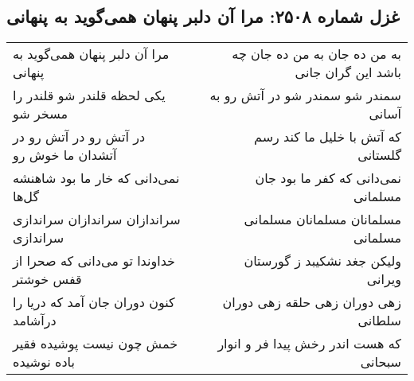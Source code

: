 \begin{center}
\section*{غزل شماره ۲۵۰۸: مرا آن دلبر پنهان همی‌گوید به پنهانی}
\label{sec:2508}
\begin{longtable}{l p{0.5cm} r}
مرا آن دلبر پنهان همی‌گوید به پنهانی
&&
به من ده جان به من ده جان چه باشد این گران جانی
\\
یکی لحظه قلندر شو قلندر را مسخر شو
&&
سمندر شو سمندر شو در آتش رو به آسانی
\\
در آتش رو در آتش رو در آتشدان ما خوش رو
&&
که آتش با خلیل ما کند رسم گلستانی
\\
نمی‌دانی که خار ما بود شاهنشه گل‌ها
&&
نمی‌دانی که کفر ما بود جان مسلمانی
\\
سراندازان سراندازان سراندازی سراندازی
&&
مسلمانان مسلمانان مسلمانی مسلمانی
\\
خداوندا تو می‌دانی که صحرا از قفس خوشتر
&&
ولیکن جغد نشکیبد ز گورستان ویرانی
\\
کنون دوران جان آمد که دریا را درآشامد
&&
زهی دوران زهی حلقه زهی دوران سلطانی
\\
خمش چون نیست پوشیده فقیر باده نوشیده
&&
که هست اندر رخش پیدا فر و انوار سبحانی
\\
\end{longtable}
\end{center}
